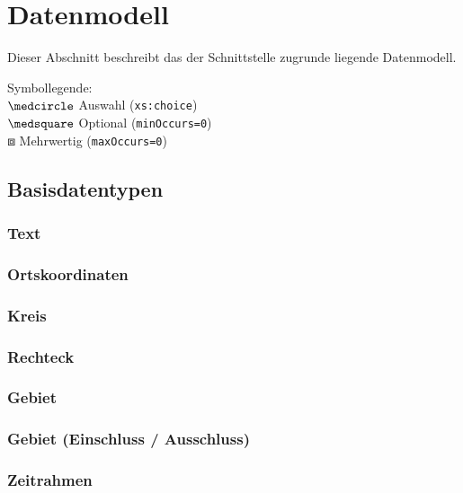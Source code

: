 \chapter{Datenmodell}
\label{sec:Datenmodell}
Dieser Abschnitt beschreibt das der Schnittstelle zugrunde liegende Datenmodell. \medskip

\noindent Symbollegende:\\
$\medcircle$ Auswahl (\verb|xs:choice|)\\
$\medsquare$ Optional (\verb|minOccurs=0|)\\
$\boxbox$ Mehrwertig (\verb|maxOccurs=0|)\\


\section{Basisdatentypen}
\label{subsec:Datenmodell:Basis}

\subsection*{Text}


\subsection*{Ortskoordinaten}


\subsection*{Kreis}


\subsection*{Rechteck}


\subsection*{Gebiet}


\subsection*{Gebiet (Einschluss / Ausschluss)}



\subsection*{Zeitrahmen}


